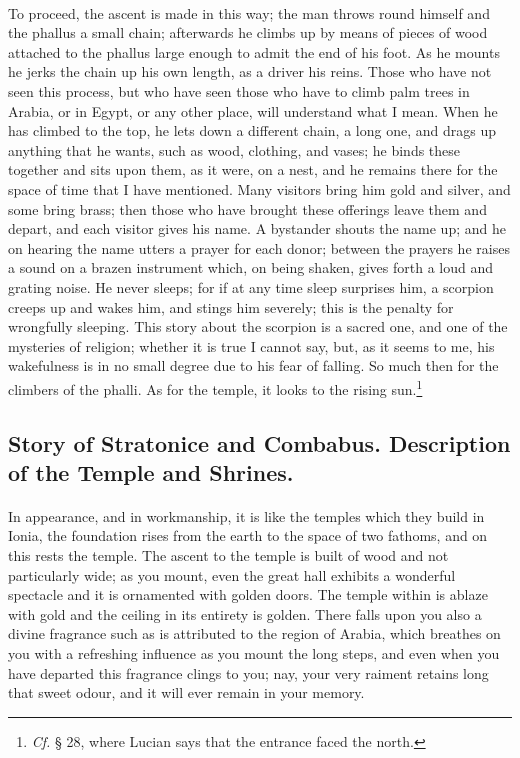 \documentclass[a4paper, 11pt, oneside, polutonikogreek, english]{article}
\begin{document}
\paragraph{}
To proceed, the ascent is made in this way; the man throws round himself and the phallus a small chain; afterwards he climbs up by means of pieces of wood attached to the phallus large enough to admit the end of his foot. As he mounts he jerks the chain up his own length, as a driver his reins. Those who have not seen this process, but who have seen those who have to climb palm trees in Arabia, or in Egypt, or any other place, will understand what I mean. When he has climbed to the top, he lets down a different chain, a long one, and drags up anything that he wants, such as wood, clothing, and vases; he binds these together and sits upon them, as it were, on a nest, and he remains there for the space of time that I have mentioned. Many visitors bring him gold and silver, and some bring brass; then those who have brought these offerings leave them and depart, and each visitor gives his name. A bystander shouts the name up; and he on hearing the name utters a prayer for each donor; between the prayers he raises a sound on a brazen instrument which, on being shaken, gives forth a loud and grating noise. He never sleeps; for if at any time sleep surprises him, a scorpion creeps up and wakes him, and stings him severely; this is the penalty for wrongfully sleeping. This story about the scorpion is a sacred one, and one of the mysteries of religion; whether it is true I cannot say, but, as it seems to me, his wakefulness is in no small degree due to his fear of falling. So much then for the climbers of the phalli. As for the temple, it looks to the rising sun.\footnote{\emph{Cf.} § 28, where Lucian says that the entrance faced the north.}

\subsection{Story of Stratonice and Combabus. Description of the Temple and Shrines.}
\paragraph{}
In appearance, and in workmanship, it is like the temples which they build in Ionia, the foundation rises from the earth to the space of two fathoms, and on this rests the temple. The ascent to the temple is built of wood and not particularly wide; as you mount, even the great hall exhibits a wonderful spectacle and it is ornamented with golden doors. The temple within is ablaze with gold and the ceiling in its entirety is golden. There falls upon you also a divine fragrance such as is attributed to the region of Arabia, which breathes on you with a refreshing influence as you mount the long steps, and even when you have departed this fragrance clings to you; nay, your very raiment retains long that sweet odour, and it will ever remain in your memory.
\end{document}
